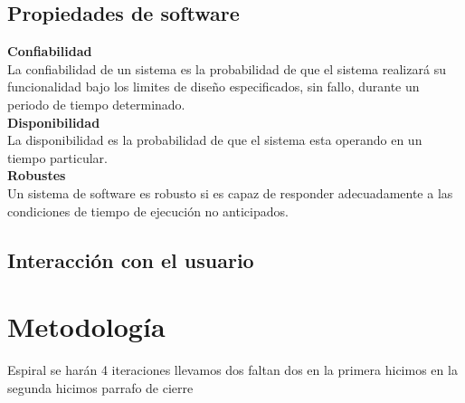 \subsection{Propiedades de software}

\textbf{Confiabilidad\\}
La confiabilidad de un sistema es la probabilidad de que el sistema realizará su funcionalidad bajo los limites de diseño especificados, sin fallo, durante un periodo de tiempo determinado. \\

\textbf{Disponibilidad\\}
La disponibilidad es la probabilidad de que el sistema esta operando en un tiempo particular.\\ 

\textbf{Robustes\\}
Un sistema de software es robusto si es capaz de responder adecuadamente a las condiciones de tiempo de ejecución no anticipados.\\


\subsection{Interacción con el usuario}


\section{Metodología}
Espiral 
se harán 4 iteraciones 
llevamos dos faltan dos 
en la primera hicimos 
en la segunda hicimos 
parrafo de cierre 

